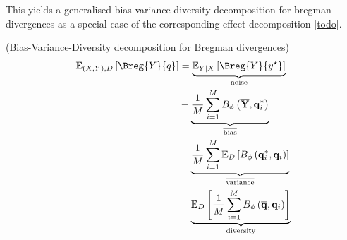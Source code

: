 \documentclass[../main.tex]{subfiles}
\begin{document}

This yields a generalised bias-variance-diversity decomposition for bregman divergences as a special case of the corresponding effect decomposition \ref{todo}.


\begin{theorem} (Bias-Variance-Diversity decomposition for Bregman divergences)
    \label{thm:bregman-diversity-decomp}
\begin{align*}
\mathbb{E}_{(X,Y), D}\left[ \Breg{Y}{q} \right]  
&= \underbrace{\mathbb{E}_{Y|X}\left[ \Breg{Y}{y^\star} \right]   }_{\text{noise}} \\
&+
\underbrace{
    \frac{1}{M} \sum_{i=1}^M B_\phi\left(\overline{\mathbf{Y}}, \mathbf{q}_i^*\right)
}_{\overline{\text{bias}}} \\
&+
\underbrace{
    \frac{1}{M} \sum_{i=1}^M \mathbb{E}_D\left[B_\phi\left(\mathbf{q}_i^*, \mathbf{q}_i\right)\right]
}_{\overline{\text{variance}}} \\
&-
\underbrace{
    \mathbb{E}_D\left[\frac{1}{M} \sum_{i=1}^M B_\phi\left(\overline{\mathbf{q}}, \mathbf{q}_i\right)\right]
}_{\text{diversity}}
\end{align*}
\end{theorem}


\end{document}
